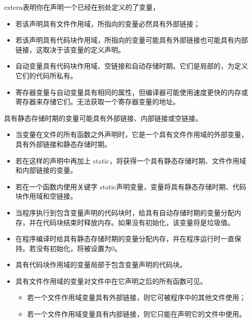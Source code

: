 \begin{frame}[fragile]\ft{\subsecname}
  { extern}表明你在声明一个已经在别处定义的了变量，
  \begin{itemize}
  \item 若该声明具有文件作用域，所指向的变量必然具有外部链接；
  \item 若该声明具有代码块作用域，所指向的变量可能具有外部链接也可能具有内部链接，这取决于该变量的定义声明。
  \end{itemize}
\end{frame}

\begin{frame}[fragile]
  \begin{itemize}
  \item 自动变量具有代码块作用域、空链接和自动存储时期。它们是局部的，为定义它们的代码所私有。

  \item 寄存器变量与自动变量具有相同的属性，但编译器可能使用速度更快的内存或寄存器来存储它们。无法获取一个寄存器变量的地址。
  \end{itemize}

  
\end{frame}

\begin{frame}[fragile]
  具有静态存储时期的变量可能具有外部链接、内部链接或空链接。
    \begin{itemize}
    \item 当变量在文件的所有函数之外声明时，它是一个具有文件作用域的外部变量，具有外部链接和静态存储时期。\\[0.1in]
    \item 若在这样的声明中再加上{ static}，将获得一个具有静态存储时期、文件作用域和内部链接的变量。\\[0.1in]
    \item 若在一个函数内使用关键字{ static}声明变量，变量将具有静态存储时期、代码块作用域和空链接。
    \end{itemize}
 
\end{frame}

\begin{frame}[fragile]
  \begin{itemize}
  \item 当程序执行到包含变量声明的代码块时，给具有自动存储时期的变量分配内存，并在代码块结束时释放内存。如果没有初始化，该变量将是垃圾值。\\[0.1in]
  \item 在程序编译时给具有静态存储时期的变量分配内存，并在程序运行时一直保持。若没有初始化，将被设置为0。
  \end{itemize}
\end{frame}

\begin{frame}[fragile]
  \begin{itemize}
  \item 具有代码块作用域的变量局部于包含变量声明的代码块。\\[0.1in]
  \item 具有文件作用域的变量对文件中在它声明之后的所有函数可见。
    \begin{itemize}
    \item 若一个文件作用域变量具有外部链接，则它可被程序中的其他文件使用；
    \item 若一个文件作用域变量具有内部链接，则它只能在声明它的文件中使用。
    \end{itemize}
  \end{itemize}
\end{frame}

